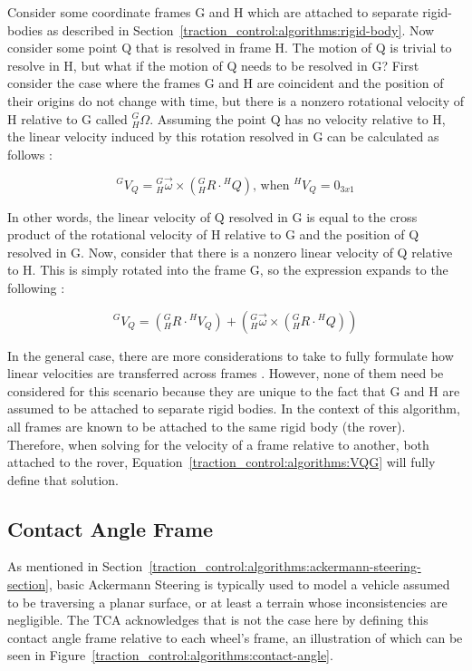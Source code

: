 Consider some coordinate frames G and H which are attached to separate rigid-bodies as described in Section~\ref{traction_control:algorithms:rigid-body}. Now consider some point Q that is resolved in frame H. The motion of Q is trivial to resolve in H, but what if the motion of Q needs to be resolved in G? First consider the case where the frames G and H are coincident and the position of their origins do not change with time, but there is a nonzero rotational velocity of H relative to G called ${}^{G}_{H}\Omega$. Assuming the point Q has no velocity relative to H, the linear velocity induced by this rotation resolved in G can be calculated as follows \cite{craig}:

\begin{equation}
	{}^{G}V_{Q} = {}^{G}_{H}\vec{\omega} \times \left({}^{G}_{H}R \cdot {}^{H}Q\right) \text{, when } {}^{H}V_{Q} = 0_{3x1}
\end{equation}

In other words, the linear velocity of Q resolved in G is equal to the cross product of the rotational velocity of H relative to G and the position of Q resolved in G. Now, consider that there is a nonzero linear velocity of Q relative to H. This is simply rotated into the frame G, so the expression expands to the following \cite{craig}:

\begin{equation}\label{traction_control:algorithms:VQG}
	{}^{G}V_{Q} = \left({}^{G}_{H}R \cdot {}^{H}V_{Q}\right) + \left({}^{G}_{H}\vec{\omega} \times \left({}^{G}_{H}R \cdot {}^{H}Q\right)\right)
\end{equation}

In the general case, there are more considerations to take to fully formulate how linear velocities are transferred across frames \cite{craig}. However, none of them need be considered for this scenario because they are unique to the fact that G and H are assumed to be attached to separate rigid bodies. In the context of this algorithm, all frames are known to be attached to the same rigid body (the rover). Therefore, when solving for the velocity of a frame relative to another, both attached to the rover, Equation~\ref{traction_control:algorithms:VQG} will fully define that solution.

\subsection{Contact Angle Frame}\label{traction_control:algorithms:contact-angle-section}
As mentioned in Section~\ref{traction_control:algorithms:ackermann-steering-section}, basic Ackermann Steering is typically used to model a vehicle assumed to be traversing a planar surface, or at least a terrain whose inconsistencies are negligible. The \ac{TCA} acknowledges that is not the case here by defining this contact angle frame relative to each wheel's frame, an illustration of which can be seen in Figure~\ref{traction_control:algorithms:contact-angle}.

